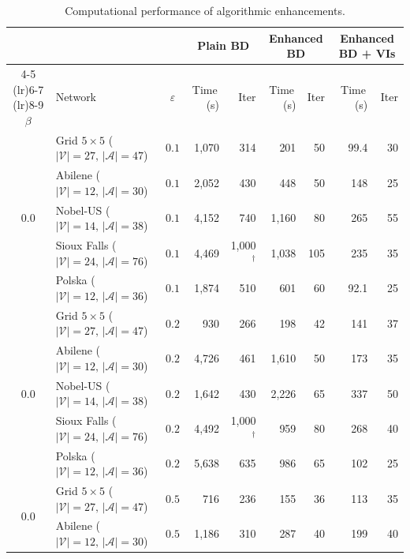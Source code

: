 \begin{table}[t]
\centering
\caption{Computational performance of algorithmic enhancements.}
\label{tab:computational}
\small
\begin{tabular}{cl c rr rr rr}
\toprule
 & & & \multicolumn{2}{c}{\textbf{Plain BD}} & \multicolumn{2}{c}{\textbf{Enhanced BD}} & \multicolumn{2}{c}{\textbf{Enhanced BD + VIs}} \\
\cmidrule(lr){4-5} \cmidrule(lr){6-7} \cmidrule(lr){8-9}
$\beta$ & Network & $\varepsilon$ & Time\,(s) & Iter & Time\,(s) & Iter & Time\,(s) & Iter \\
\midrule
\multirow{5}{*}{$0.0$} & Grid $5\times5$ {\scriptsize($|\mathcal{V}|\!=\!27,\, |\mathcal{A}|\!=\!47$)} & $0.1$ & 1,070 & 314 & 201 & 50 & 99.4 & 30 \\
 & Abilene {\scriptsize($|\mathcal{V}|\!=\!12,\, |\mathcal{A}|\!=\!30$)} & $0.1$ & 2,052 & 430 & 448 & 50 & 148 & 25 \\
 & Nobel-US {\scriptsize($|\mathcal{V}|\!=\!14,\, |\mathcal{A}|\!=\!38$)} & $0.1$ & 4,152 & 740 & 1,160 & 80 & 265 & 55 \\
 & Sioux Falls {\scriptsize($|\mathcal{V}|\!=\!24,\, |\mathcal{A}|\!=\!76$)} & $0.1$ & 4,469 & 1,000$^\dagger$ & 1,038 & 105 & 235 & 35 \\
 & Polska {\scriptsize($|\mathcal{V}|\!=\!12,\, |\mathcal{A}|\!=\!36$)} & $0.1$ & 1,874 & 510 & 601 & 60 & 92.1 & 25 \\
\midrule
\multirow{5}{*}{$0.0$} & Grid $5\times5$ {\scriptsize($|\mathcal{V}|\!=\!27,\, |\mathcal{A}|\!=\!47$)} & $0.2$ & 930 & 266 & 198 & 42 & 141 & 37 \\
 & Abilene {\scriptsize($|\mathcal{V}|\!=\!12,\, |\mathcal{A}|\!=\!30$)} & $0.2$ & 4,726 & 461 & 1,610 & 50 & 173 & 35 \\
 & Nobel-US {\scriptsize($|\mathcal{V}|\!=\!14,\, |\mathcal{A}|\!=\!38$)} & $0.2$ & 1,642 & 430 & 2,226 & 65 & 337 & 50 \\
 & Sioux Falls {\scriptsize($|\mathcal{V}|\!=\!24,\, |\mathcal{A}|\!=\!76$)} & $0.2$ & 4,492 & 1,000$^\dagger$ & 959 & 80 & 268 & 40 \\
 & Polska {\scriptsize($|\mathcal{V}|\!=\!12,\, |\mathcal{A}|\!=\!36$)} & $0.2$ & 5,638 & 635 & 986 & 65 & 102 & 25 \\
\midrule
\multirow{5}{*}{$0.0$} & Grid $5\times5$ {\scriptsize($|\mathcal{V}|\!=\!27,\, |\mathcal{A}|\!=\!47$)} & $0.5$ & 716 & 236 & 155 & 36 & 113 & 35 \\
 & Abilene {\scriptsize($|\mathcal{V}|\!=\!12,\, |\mathcal{A}|\!=\!30$)} & $0.5$ & 1,186 & 310 & 287 & 40 & 199 & 40 \\

\end{tabular}
\end{table}
